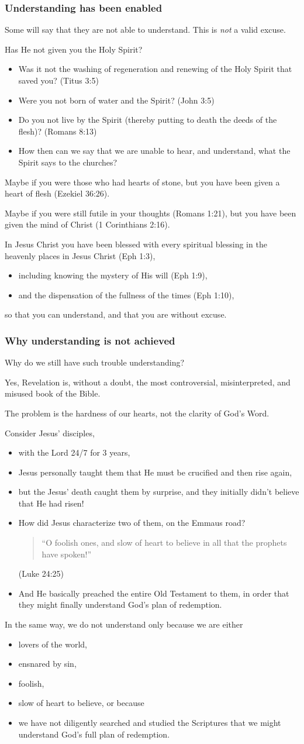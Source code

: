 \documentclass[12pt]{article}
\newcommand{\BI}{\begin{itemize}}
\newcommand{\EI}{\end{itemize}}
\newcommand{\I}{\item}
\newcommand{\Q}[1]{\begin{quote} #1 \end{quote}}
\begin{document}
\subsubsection{Understanding has been enabled}
\I Some will say that they are not able to understand. This is \emph{not}
    a valid excuse.
\I Has He not given you the Holy Spirit?
\BI \I Was it not the washing of regeneration and renewing of the Holy Spirit
        that saved you? (Titus 3:5)
    \I Were you not born of water and the Spirit? (John 3:5)
    \I Do you not live by the Spirit (thereby putting to death 
        the deeds of the flesh)? (Romans 8:13)
    \I How then can we say that we are unable to hear, and understand,
        what the Spirit says to the churches? \EI
\I Maybe if you were those who had hearts of stone,
    but you have been given a heart of flesh (Ezekiel 36:26).
\I Maybe if you were still futile in your thoughts (Romans 1:21), 
    but you have been given the mind of Christ (1 Corinthians 2:16).
\I In Jesus Christ you have been blessed with every spiritual blessing 
    in the heavenly places in Jesus Christ (Eph 1:3), 
\BI \I including knowing the mystery of His will (Eph 1:9), 
    \I and the dispensation of the fullness of the times (Eph 1:10), \EI
\I so that you can understand, and that you are without excuse.

\subsubsection{Why understanding is not achieved}
\I Why do we still have such trouble understanding?
\I Yes, Revelation is, without a doubt, the most
    controversial, misinterpreted, and misused book of the Bible.
\I The problem is the hardness of our hearts, not the clarity of God's Word.
\I Consider Jesus' disciples,
\BI \I with the Lord 24/7 for 3 years,
    \I Jesus personally taught them that He must be crucified and then 
        rise again,
    \I but the Jesus' death caught them by surprise,
        and they initially didn't believe that He had risen!
    \I How did Jesus characterize two of them, on the Emmaus road?
        \Q{``O foolish ones, and slow of heart to believe in all that the 
            prophets have spoken!''} (Luke 24:25)
    \I And He basically preached the entire Old Testament to them,
        in order that they might finally understand God's plan of redemption. 
    \EI
\I In the same way, we do not understand only because we are either
\BI \I lovers of the world, 
    \I ensnared by sin, 
    \I foolish,
    \I slow of heart to believe, or because 
    \I we have not diligently searched and studied the Scriptures 
        that we might understand God's full plan of redemption. \EI
                
\end{document}
